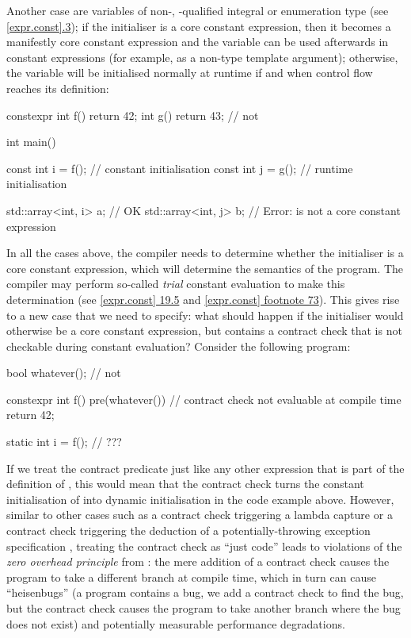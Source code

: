 Another case are variables of non-, -qualified integral or enumeration type (see \href{https://eel.is/c++draft/expr.const#3}{[expr.const].3}); if the initialiser is a core constant expression, then it becomes a manifestly core constant expression and the variable can be used afterwards in constant expressions (for example, as a non-type template argument); otherwise, the variable will be initialised normally at runtime if and when control flow reaches its definition:

\begin{codeblock}
constexpr int f() { return 42; }
int g() { return 43; }  // not 

int main() {
  const int i = f();   // constant initialisation
  const int j = g();  // runtime initialisation
  
  std::array<int, i> a;  // OK
  std::array<int, j> b;  // Error:  is not a core constant expression
}
\end{codeblock}

In all the cases above, the compiler needs to determine whether the initialiser is a core constant expression, which will determine the semantics of the program. The compiler may perform so-called \emph{trial} constant evaluation to make this determination (see \href{https://eel.is/c++draft/expr.const#19.5}{[expr.const] 19.5} and \href{https://eel.is/c++draft/expr.const#footnote-73}{[expr.const] footnote 73}). This gives rise to a new case that we need to specify: what should happen if the initialiser would otherwise be a core constant expression, but contains a contract check that is not checkable during constant evaluation? Consider the following program:

\begin{codeblock}
bool whatever();     // not 

constexpr int f()
  pre(whatever())    // contract check not evaluable at compile time
{  
  return 42;
}

static int i = f();  // ???
\end{codeblock}

If we treat the contract predicate just like any other expression that is part of the definition of , this would mean that the contract check turns the constant initialisation of  into dynamic initialisation in the code example above. However, similar to other cases such as a contract check triggering a lambda capture \cite{P2890R1} or a contract check triggering the deduction of a potentially-throwing exception specification \cite{P2969R0}, treating the contract check as ``just code'' leads to violations of the \emph{zero overhead principle} from \cite{P2932R1}: the mere addition of a contract check causes the program to take a different branch at compile time, which in turn can cause ``heisenbugs'' (a program contains a bug, we add a contract check to find the bug, but the contract check causes the program to take another branch where the bug does not exist) and potentially measurable performance degradations.


